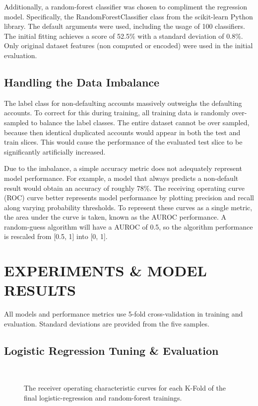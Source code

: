 \documentclass[conference]{IEEEtran}
\begin{document}
Additionally, a random-forest classifier was chosen to compliment the
regression model. Specifically, the RandomForestClassifier class from the
scikit-learn Python library\cite{sklearn_api}. The default arguments were used,
including the usage of 100 classifiers. The initial fitting achieves a score of
52.5\% with a standard deviation of 0.8\%. Only original dataset features (non
computed or encoded) were used in the initial evaluation.

\subsection{Handling the Data Imbalance}

The label class for non-defaulting accounts massively outweighs the defaulting
accounts. To correct for this during training, all training data is randomly
over-sampled to balance the label classes. The entire dataset cannot be over
sampled, because then identical duplicated accounts would appear in both the
test and train slices. This would cause the performance of the evaluated test
slice to be significantly artificially increased.

Due to the imbalance, a simple accuracy metric does not adequately represent
model performance. For example, a model that always predicts a non-default
result would obtain an accuracy of roughly 78\%. The receiving operating curve
(ROC) curve better represents model performance by plotting precision and
recall along varying probability thresholds. To represent these curves as a
single metric, the area under the curve is taken, known as the AUROC
performance. A random-guess algorithm will have a AUROC of 0.5, so the
algorithm performance is rescaled from [0.5, 1] into [0, 1].

\FloatBarrier
\section{EXPERIMENTS \& MODEL RESULTS} \label{results}

All models and performance metrics use 5-fold cross-validation in training and
evaluation. Standard deviations are provided from the five samples.

\subsection{Logistic Regression Tuning \& Evaluation}

\begin{figure}
	\\
	\caption{The receiver operating characteristic curves for each K-Fold of the final logistic-regression and random-forest trainings.}
	\label{roc}
\end{figure}
\end{document}
